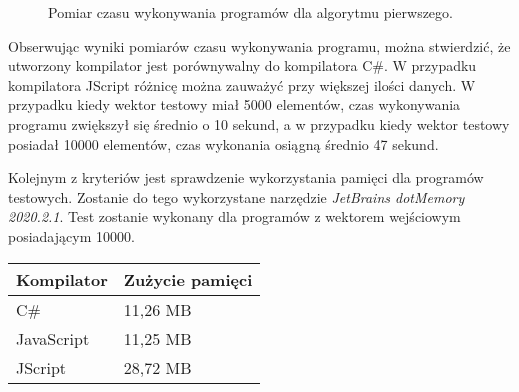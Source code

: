 \begin{figure}[h!]
  \centering
  \caption{Pomiar czasu wykonywania programów dla algorytmu pierwszego.}
\end{figure}

\par Obserwując wyniki pomiarów czasu wykonywania programu, można stwierdzić, że utworzony kompilator jest porównywalny do kompilatora C\#. W przypadku kompilatora JScript różnicę można zauważyć przy większej ilości danych. W przypadku kiedy wektor testowy miał 5000 elementów, czas wykonywania programu zwiększył się średnio o 10 sekund, a w przypadku kiedy wektor testowy posiadał 10000 elementów, czas wykonania osiągną średnio 47 sekund.

\par Kolejnym z kryteriów jest sprawdzenie wykorzystania pamięci dla programów testowych. Zostanie do tego wykorzystane narzędzie \textit{JetBrains dotMemory 2020.2.1}. Test zostanie wykonany dla programów z wektorem wejściowym posiadającym 10000.

\begin{table}[h!]
  \centering
  \begin{tabular}{|l|l|}
  \hline
  Kompilator & Zużycie pamięci \\ \hline
  C\# & 11,26 MB \\ \hline
  JavaScript & 11,25 MB \\ \hline
  JScript & 28,72 MB \\ \hline
  \end{tabular}
\end{table}

